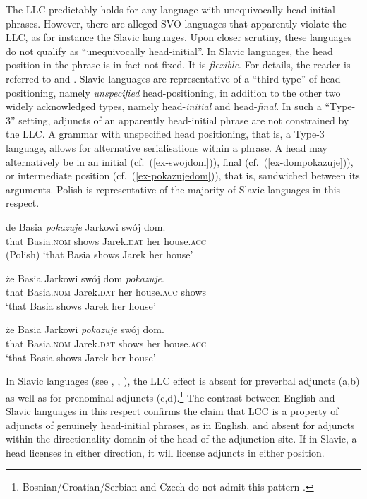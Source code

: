 \documentclass[output=paper
  ,nobabel
  ,uniformtopskip %
]{langscibook}
\begin{document}
\largerpage
\noindent
The LLC predictably holds for any language with unequivocally head-initial phrases. However, there are alleged SVO languages that apparently violate the LLC, as for instance the Slavic languages. Upon closer scrutiny, these languages do not qualify as ``unequivocally head-initial''. In Slavic languages, the head position in the phrase is in fact not fixed. It is \emph{flexible}. For details, the reader is referred to \citet{HaiderSzucsich2022a} and \citet{SzucsichHaider2015}.
Slavic languages are representative of a ``third type'' of head-positioning, namely \emph{unspecified} head-positioning, in addition to the other two widely acknowledged types, namely
head-\emph{initial} and head-\emph{final}. In such a ``Type-3'' setting, adjuncts of an apparently head-initial phrase are not constrained by the LLC. A grammar with unspecified head positioning, that is, a Type-3 language, allows for alternative serialisations within a phrase. A head may alternatively be in an initial (cf.\ (\ref{ex-swojdom})), final (cf.\ (\ref{ex-dompokazuje})), or intermediate position (cf.\ (\ref{ex-pokazujedom})), that is, sandwiched between its arguments. Polish is representative of the majority of Slavic languages in this respect.


\eal\label{ex-slavic}
\ex\label{ex-swojdom}
\gll de Basia \emph{pokazuje} Jarkowi swój dom. \\
that Basia\textsc{.nom} shows Jarek\textsc{.dat} her house\textsc{.acc} \\\hfill(Polish)
\glt `that Basia shows Jarek her house'

\ex\label{ex-dompokazuje}
\gll że Basia Jarkowi swój dom \emph{pokazuje}. \\
that Basia\textsc{.nom} Jarek\textsc{.dat} her house\textsc{.acc} shows \\
\glt `that Basia shows Jarek her house'


\ex\label{ex-pokazujedom}
\gll że Basia Jarkowi \emph{pokazuje} swój dom. \\
that Basia\textsc{.nom} Jarek\textsc{.dat} shows her house\textsc{.acc} \\
\glt `that Basia shows Jarek her house'

\zl

\largerpage
\noindent
In Slavic languages (see \citealt[116]{SiewierskaUhlirova1998a}, \citealt[16]{HaiderSzucsich2022a},
\citealt[Section~6]{HaiderSzucsich2022b}), the LLC effect is absent for preverbal adjuncts
(a,b) as well as for prenominal adjuncts (c,d).\footnote{%
Bosnian/Croatian/Serbian and Czech do not admit this pattern \citep[116]{SiewierskaUhlirova1998a}.
} The contrast between English and Slavic
languages in this respect confirms the claim that LCC is a property of adjuncts of genuinely
head-initial phrases, as in English, and absent for adjuncts within the directionality domain of the
head of the adjunction site. If in Slavic, a head licenses in either direction, it will license
adjuncts in either position.
\end{document}
